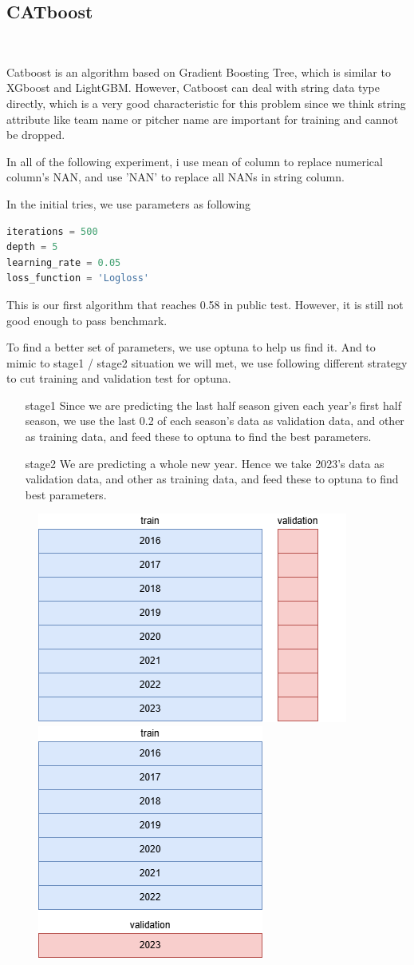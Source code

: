 \subsection*{CATboost}
\ \par Catboost is an algorithm based on Gradient Boosting Tree, which is similar to XGboost and LightGBM. However, Catboost can deal with string data type directly, which is a very good characteristic for this problem since we think string attribute like team name or pitcher name are important for training and cannot be dropped. 
\par In all of the following experiment, i use mean of column to replace numerical column's NAN, and use 'NAN' to replace all NANs in string column. 
\par In the initial tries, we use parameters as following
\begin{lstlisting}[language=Python]
iterations = 500
depth = 5
learning_rate = 0.05
loss_function = 'Logloss'
\end{lstlisting}
\par This is our first algorithm that reaches 0.58 in public test. However, it is still not good enough to pass benchmark. 
\par To find a better set of parameters, we use optuna to help us find it. And to mimic to stage1 / stage2 situation we will met, we use following different strategy to cut training and validation test for optuna.
\begin{itemize}
    \item[stage1] Since we are predicting the last half season given each year's first half season, we use the last 0.2 of each season's data as validation data, and other as training data, and feed these to optuna to find the best parameters.
    \item[stage2] We are predicting a whole new year. Hence we take 2023's data as validation data, and other as training data, and feed these to optuna to find best parameters.
\end{itemize}
\begin{figure}[h]
    \centering
    \includegraphics[width=0.25\linewidth]{Pictures/MLdatacut_stage1.drawio.png}
    \includegraphics[width=0.17\linewidth]{Pictures/MLdatacut_stage2.drawio.png}
\end{figure}
